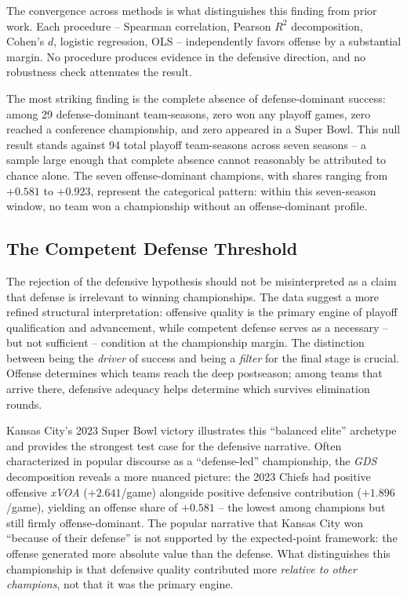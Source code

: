 \documentclass[12pt,a4paper]{article}
\newcommand{\xvoa}{\textit{xVOA}}
\newcommand{\gds}{\textit{GDS}}
\begin{document}
The convergence across methods is what distinguishes this finding from prior work. Each procedure -- Spearman correlation, Pearson $R^2$ decomposition, Cohen's $d$, logistic regression, OLS -- independently favors offense by a substantial margin. No procedure produces evidence in the defensive direction, and no robustness check attenuates the result.

The most striking finding is the complete absence of defense-dominant success: among 29 defense-dominant team-seasons, zero won any playoff games, zero reached a conference championship, and zero appeared in a Super Bowl. This null result stands against 94 total playoff team-seasons across seven seasons -- a sample large enough that complete absence cannot reasonably be attributed to chance alone. The seven offense-dominant champions, with shares ranging from $+0.581$ to $+0.923$, represent the categorical pattern: within this seven-season window, no team won a championship without an offense-dominant profile.

\subsection{The Competent Defense Threshold}
\label{sec:threshold}

The rejection of the defensive hypothesis should not be misinterpreted as a claim that defense is irrelevant to winning championships. The data suggest a more refined structural interpretation: offensive quality is the primary engine of playoff qualification and advancement, while competent defense serves as a necessary -- but not sufficient -- condition at the championship margin. The distinction between being the \emph{driver} of success and being a \emph{filter} for the final stage is crucial. Offense determines which teams reach the deep postseason; among teams that arrive there, defensive adequacy helps determine which survives elimination rounds.

Kansas City's 2023 Super Bowl victory illustrates this ``balanced elite'' archetype and provides the strongest test case for the defensive narrative. Often characterized in popular discourse as a ``defense-led'' championship, the \gds{} decomposition reveals a more nuanced picture: the 2023 Chiefs had positive offensive \xvoa{} ($+2.641$/game) alongside positive defensive contribution ($+1.896$/game), yielding an offense share of $+0.581$ -- the lowest among champions but still firmly offense-dominant. The popular narrative that Kansas City won ``because of their defense'' is not supported by the expected-point framework: the offense generated more absolute value than the defense. What distinguishes this championship is that defensive quality contributed more \emph{relative to other champions}, not that it was the primary engine.
\end{document}
